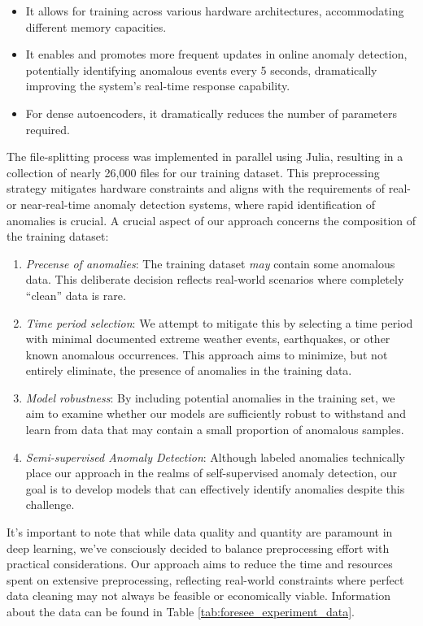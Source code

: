 \begin{itemize}
    \item It allows for training across various hardware architectures, accommodating different memory capacities.
    \item It enables and promotes more frequent updates in online anomaly detection, potentially identifying anomalous events every 5 seconds, dramatically improving the system's real-time response capability.
    \item For dense autoencoders, it dramatically reduces the number of parameters required.
\end{itemize}


The file-splitting process was implemented in parallel using Julia, resulting in a collection of nearly 26,000 files for our training dataset. This preprocessing strategy mitigates hardware constraints and aligns with the requirements of real- or near-real-time anomaly detection systems, where rapid identification of anomalies is crucial. A crucial aspect of our approach concerns the composition of the training dataset:

\begin{enumerate}
    \item \textit{Precense of anomalies}: The training dataset \textit{may} contain some anomalous data. This deliberate decision reflects real-world scenarios where completely ``clean'' data is rare.
    \item \textit{Time period selection}: We attempt to mitigate this by selecting a time period with minimal documented extreme weather events, earthquakes, or other known anomalous occurrences. This approach aims to minimize, but not entirely eliminate, the presence of anomalies in the training data.
    \item \textit{Model robustness}: By including potential anomalies in the training set, we aim to examine whether our models are sufficiently robust to withstand and learn from data that may contain a small proportion of anomalous samples.
    \item \textit{Semi-supervised Anomaly Detection}: Although labeled anomalies technically place our approach in the realms of self-supervised anomaly detection, our goal is to develop models that can effectively identify anomalies despite this challenge.
\end{enumerate}

It's important to note that while data quality and quantity are paramount in deep learning, we've consciously decided to balance preprocessing effort with practical considerations. Our approach aims to reduce the time and resources spent on extensive preprocessing, reflecting real-world constraints where perfect data cleaning may not always be feasible or economically viable. Information about the data can be found in Table \ref{tab:foresee_experiment_data}. 


